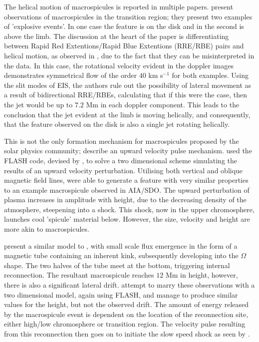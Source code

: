 The helical motion of macrospicules is reported in multiple papers.
\cite{Curdt2011} present observations of macrospicules in the transition region; they present two examples of 'explosive events'.
In one case the feature is on the disk and in the second is above the limb.
The discussion at the heart of the paper is differentiating between Rapid Red Extentions/Rapid Blue Extentions (RRE/RBE) pairs and helical motion, as observed in \cite{Kuridze2015}, due to the fact that they can be misinterpreted in the data.
In this case, the rotational velocity evident in the doppler images demonstrates symmetrical flow of the order $40$ km s${^{-1}}$ for both examples.
Using the slit modes of EIS, the authors rule out the possibility of lateral movement as a result of bidirectional RRE/RBEs, calculating that if this were the case, then the jet would be up to $7.2$ Mm in each doppler component.
This leads to the conclusion that the jet evident at the limb is moving helically, and consequently, that the feature observed on the disk is also a single jet rotating helically.

This is not the only formation mechanism for macrospicules proposed by the solar physics community; \cite{Murawski2011} describe an upward velocity pulse mechanism.
\cite{Murawski2011} used the FLASH code, devised by \cite{Lee2009}, to solve a two dimensional scheme simulating the results of an upward velocity perturbation.
Utilising both vertical and oblique magnetic field lines, \cite{Murawski2011} were able to generate a feature with very similar properties to an example macrospicule observed in AIA/SDO.
The upward perturbation of plasma increases in amplitude with height, due to the decreasing density of the atmosphere, steepening into a shock.
This shock, now in the upper chromosphere, launches cool 'spicule' material below.
However, the size, velocity and height are more akin to macrospicules.

\cite{Kayshap2013} present a similar model to \cite{Archontis2005}, with small scale flux emergence in the form of a magnetic tube containing an inherent kink, subsequently developing into the $\Omega$ shape.
The two halves of the tube meet at the bottom, triggering internal reconnection.
The resultant macrospicule reaches $12$ Mm in height, however, there is also a significant lateral drift.
\cite{Kayshap2013} attempt to marry these observations with a two dimensional model, again using FLASH, and manage to produce similar values for the height, but not the observed drift.
The amount of energy released by the macrospicule event is dependent on the location of the reconnection site, either high/low chromosphere or transition region.
The velocity pulse resulting from this reconnection then goes on to initiate the slow speed shock as seen by \cite{Murawski2011}.


